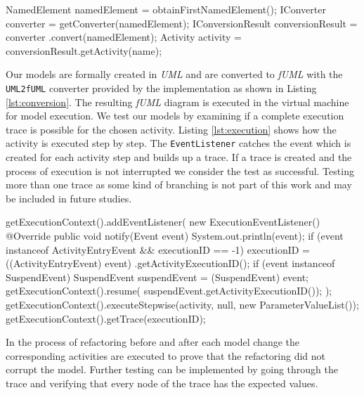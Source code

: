 \documentclass{llncs}
\begin{document}
\begin{lstsingle}[language=Java,caption=Converting the UML diagram to fUML,label=lst:conversion]
NamedElement namedElement = obtainFirstNamedElement();
IConverter converter = getConverter(namedElement);
IConversionResult conversionResult = converter
  .convert(namedElement);
Activity activity = conversionResult.getActivity(name);
\end{lstsingle}

Our models are formally created in \textit{UML} and are converted to \textit{fUML} with the \texttt{UML2fUML} converter 
provided by the implementation as shown in Listing \ref{lst:conversion}. The resulting \textit{fUML} diagram is executed in the 
virtual machine for model execution. 
We test our models by examining if a complete execution trace is possible for the chosen activity. Listing \ref{lst:execution} 
shows how the activity is executed step by step. The \texttt{EventListener} catches the event which is created for each 
activity step and builds up a trace. If a trace is created and the process of execution is not interrupted we consider the 
test as successful. Testing more than one trace as some kind of branching is not part of this work and may be included in future studies.

\begin{lstsingle}[language=Java,caption=Executing the activity stepwise and getting the execution trace,label=lst:execution]
getExecutionContext().addEventListener(
  new ExecutionEventListener() {
  @Override
  public void notify(Event event) {
    System.out.println(event);
    if (event instanceof ActivityEntryEvent 
      && executionID == -1) {
      executionID = ((ActivityEntryEvent) event)
          .getActivityExecutionID();
    }
    if (event instanceof SuspendEvent) {
      SuspendEvent suspendEvent = (SuspendEvent) event;
      getExecutionContext().resume(
          suspendEvent.getActivityExecutionID());
    }
  }
});
getExecutionContext().executeStepwise(activity, null, 
  new ParameterValueList());
getExecutionContext().getTrace(executionID);
\end{lstsingle}

In the process of refactoring before and after each model change the corresponding activities are executed to prove that 
the refactoring did not corrupt the model. 
Further testing can be implemented by going through the trace and verifying 
that every node of the trace has the expected values.
\end{document}
